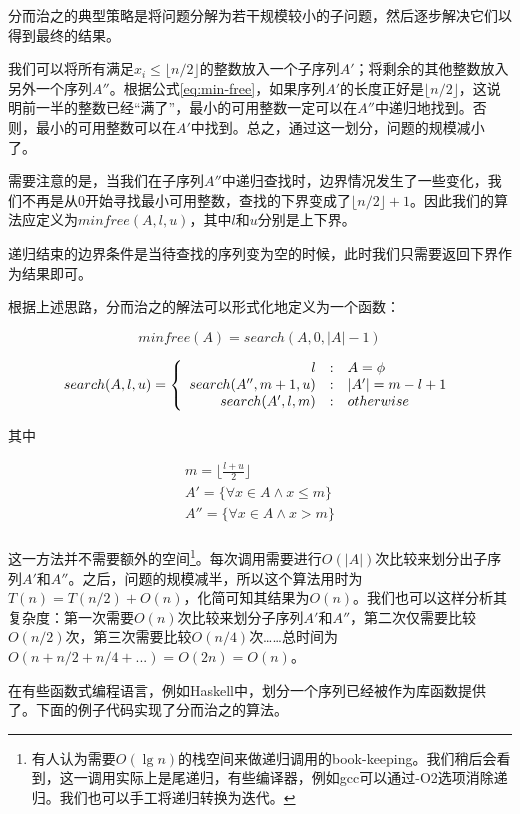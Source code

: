 \documentclass[UTF8]{article}
\begin{document}
分而治之的典型策略是将问题分解为若干规模较小的子问题，然后逐步解决它们以得到最终的结果。

我们可以将所有满足$x_i \leq \lfloor n/2 \rfloor$的整数放入一个子序列$A'$；将剩余的其他整数放入另外一个序列$A''$。根据公式\ref{eq:min-free}，如果序列$A'$的长度正好是$\lfloor n/2 \rfloor$，这说明前一半的整数已经“满了”，最小的可用整数一定可以在$A''$中递归地找到。否则，最小的可用整数可以在$A'$中找到。总之，通过这一划分，问题的规模减小了。

需要注意的是，当我们在子序列$A''$中递归查找时，边界情况发生了一些变化，我们不再是从0开始寻找最小可用整数，查找的下界变成了$\lfloor n/2 \rfloor + 1$。因此我们的算法应定义为$minfree(A, l, u)$，其中$l$和$u$分别是上下界。

递归结束的边界条件是当待查找的序列变为空的时候，此时我们只需要返回下界作为结果即可。

根据上述思路，分而治之的解法可以形式化地定义为一个函数：

\[
minfree(A) = search(A, 0, |A|-1)
\]

\[
search(A, l, u) = \left \{
       \begin{array}
       {r@{\quad:\quad}l}
       l & A = \phi \\
       search(A'', m+1, u) &  |A'| = m - l + 1 \\
       search(A',  l, m) & otherwise
       \end{array}
\right.
\]

其中

\[ \begin{array}{l}
m = \displaystyle \lfloor \frac{l+u}{2} \rfloor \\
A'  = \{ \forall x \in A \wedge x \leq m \} \\
A'' = \{ \forall x \in A \wedge x > m \} \\
\end{array} \]

这一方法并不需要额外的空间\footnote{有人认为需要$O(\lg n)$的栈空间来做递归调用的book-keeping。我们稍后会看到，这一调用实际上是尾递归，有些编译器，例如gcc可以通过-O2选项消除递归。我们也可以手工将递归转换为迭代。}。每次调用需要进行$O(|A|)$次比较来划分出子序列$A'$和$A''$。之后，问题的规模减半，所以这个算法用时为$T(n) = T(n/2) + O(n)$，化简可知其结果为$O(n)$。我们也可以这样分析其复杂度：第一次需要$O(n)$次比较来划分子序列$A'$和$A''$，第二次仅需要比较$O(n/2)$次，第三次需要比较$O(n/4)$次……总时间为$O(n + n/2 + n/4 + ...) = O(2n) = O(n)$。

在有些函数式编程语言，例如Haskell中，划分一个序列已经被作为库函数提供了。下面的例子代码实现了分而治之的算法。
\end{document}
